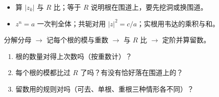 \documentclass[11pt]{ctexart}
\let\origsubhdr\subhdr
\renewcommand{\subhdr}[1]{\par\needspace{4\baselineskip}\origsubhdr{#1}}
\begin{document}

\begin{itemize}
\item 算 $|z_k|$ 与 $R$ 比；等于 $R$ 说明根在围道上，要先挖洞或换围道。
\item $z^{n}=a$ 一次判全体；共轭对用 $|z|^{2}=c/a$；实根用韦达的乘积与和。
\end{itemize}


分解分母 $\to$ 记每个根的模与重数 $\to$ 与 $R$ 比 $\to$ 定阶并算留数。


\begin{enumerate}
\item 根的数量对得上次数吗（按重数计）？
\item 每个根的模都比过 $R$ 了吗？有没有恰好落在围道上的？
\item 留数用的规则对吗（可去、单根、重根三种情形各不同）？
\end{enumerate}
\end{document}
